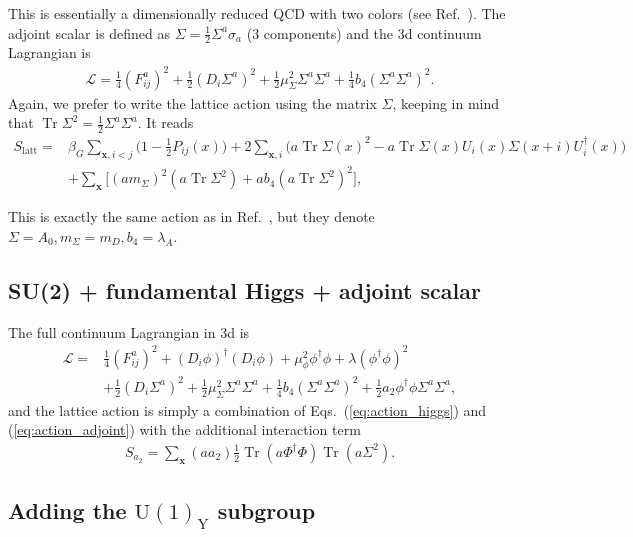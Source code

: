 \documentclass[11pt,a4paper]{article}
\newcommand\Tr{\operatorname{Tr}}
\newcommand\he[1]{#1^\dagger}%
\newcommand\gr[1]{\mathrm{#1}}%
\begin{document}
This is essentially a dimensionally reduced QCD with two colors (see Ref.~\cite{Kajantie:1997tt}). The adjoint scalar is defined as $\Sigma = \frac12 \Sigma^a \sigma_a$ (3 components) and the 3d continuum Lagrangian is 
\begin{align}
\mathcal{L} = \frac14 (F^a_{ij})^2 + \frac12 (D_i \Sigma^a)^2 + \frac12 \mu^2_\Sigma \Sigma^a\Sigma^a + \frac14 b_4 (\Sigma^a\Sigma^a)^2.
\end{align}
Again, we prefer to write the lattice action using the matrix $\Sigma$, keeping in mind that $\Tr \Sigma^2 = \frac12 \Sigma^a \Sigma^a$. It reads
\begin{align}
\label{eq:action_adjoint}
S_\text{latt} =& \beta_G \sum_{\textbf{x}, i<j} \Big(1-\frac12 P_{ij}(x)\Big) + 2\sum_{\textbf{x},i} \Big( a \Tr\Sigma(x)^2 - a \Tr\Sigma(x)U_i(x)\Sigma(x+i)\he U_i(x) \Big) \nonumber \\
& + \sum_\textbf{x} \bigg[ (a m_\Sigma)^2 (a \Tr \Sigma^2) + a b_4 (a \Tr \Sigma^2)^2\bigg],
\end{align}

This is exactly the same action as in Ref.~\cite{Kajantie:1997tt}, but they denote $\Sigma = A_0, m_\Sigma = m_D, b_4 = \lambda_A$.

\subsection{SU(2) + fundamental Higgs + adjoint scalar}

The full continuum Lagrangian in 3d is 
\begin{align}
\mathcal{L} =& \frac14 (F^a_{ij})^2 + (D_i \phi)^\dagger (D_i \phi) + \mu^2_\phi \phi^\dagger\phi + \lambda (\phi^\dagger\phi)^2 \nonumber \\ 
& + \frac12 (D_i \Sigma^a)^2 + \frac12 \mu^2_\Sigma \Sigma^a\Sigma^a + \frac14 b_4 (\Sigma^a\Sigma^a)^2 +\frac12 a_2 \phi^\dagger\phi \Sigma^a\Sigma^a,
\end{align}
and the lattice action is simply a combination of Eqs.~(\ref{eq:action_higgs}) and (\ref{eq:action_adjoint}) with the additional interaction term
\begin{align}
S_{a_2} = \sum_\textbf{x} (a a_2) \frac12 \Tr (a\he\Phi\Phi) \Tr (a\Sigma^2). 
\end{align}


\subsection{Adding the $\gr{U(1)_Y}$ subgroup}
\end{document}
